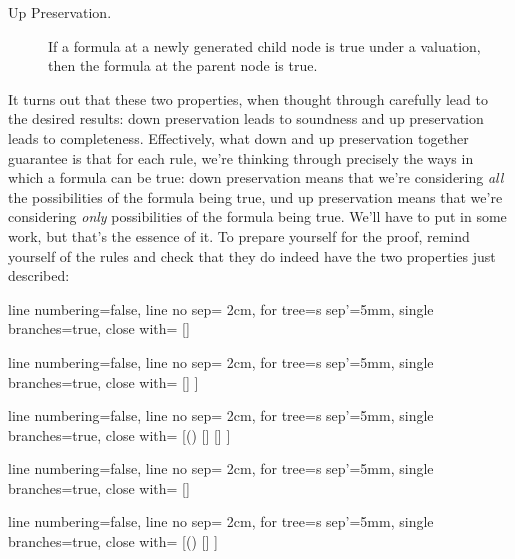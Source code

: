 \begin{enumerate}[\thesection.1]
\begin{description}
				\item[Up Preservation.] If a formula at a newly generated child node is true under a valuation, then the formula at the parent node is true.
				
		\end{description}
It turns out that these two properties, when thought through carefully lead to the desired results: down preservation leads to soundness and up preservation leads to completeness. Effectively, what down and up preservation together guarantee is that for each rule, we're thinking through precisely the ways in which a formula can be true: down preservation means that we're considering \emph{all} the possibilities of the formula being true, und up preservation means that we're considering \emph{only} possibilities of the formula being true. We'll have to put in some work, but that's the essence of it. To prepare yourself for the proof, remind yourself of the rules and check that they do indeed have the two properties just described:	
	
	
			\begin{center}
					
					\begin{prooftree}
					{
					line numbering=false,
					line no sep= 2cm,
					for tree={s sep'=5mm},
					single branches=true,
					close with=\xmark
					}
					[\neg\neg \phi [\phi ] ]
					\end{prooftree}
					\begin{prooftree}
					{
					line numbering=false,
					line no sep= 2cm,
					for tree={s sep'=5mm},
					single branches=true,
					close with=\xmark
					}
					[\phi\land\psi [\phi [\psi ] ] ]
					\end{prooftree}
					\begin{prooftree}
					{
					line numbering=false,
					line no sep= 2cm,
					for tree={s sep'=5mm},
					single branches=true,
					close with=\xmark
					}
					[\neg (\phi\land\psi) [\neg \phi ] [\neg \psi ] ]
					\end{prooftree}
					\begin{prooftree}
					{
					line numbering=false,
					line no sep= 2cm,
					for tree={s sep'=5mm},
					single branches=true,
					close with=\xmark
					}
					[\phi\lor\psi [\phi ] [\psi ] ]
					\end{prooftree}
					\begin{prooftree}
					{
					line numbering=false,
					line no sep= 2cm,
					for tree={s sep'=5mm},
					single branches=true,
					close with=\xmark
					}
					[\neg(\phi\lor\psi) [\neg\phi [\neg\psi ] ] ]
					\end{prooftree}


\end{center}
\end{enumerate}
